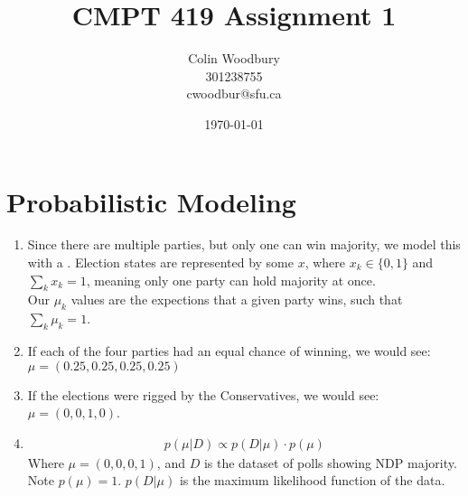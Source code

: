\documentclass{article}
\begin{document}
\title{CMPT 419 Assignment 1}
\author{Colin Woodbury\\ 301238755\\ cwoodbur@sfu.ca}
\date{\today}
\maketitle

\tableofcontents
\clearpage

\section{Probabilistic Modeling}

\begin{enumerate}
\item Since there are multiple parties, but only one can win majority,
  we model this with a . Election states
  are represented by some $x$, where $x_k \in \{0,1\}$ and $\sum_k x_k = 1$,
  meaning only one party can hold majority at once.\\
  Our $\mu_k$ values are the expections that a given party wins, such that
  $\sum_k \mu_k = 1$.
\item If each of the four parties had an equal chance of winning,
  we would see: $\mu = (0.25, 0.25, 0.25, 0.25)$
\item If the elections were rigged by the Conservatives, we would see:
  $\mu = (0,0,1,0)$.
\item \begin{align*}
  p(\mu | D) \propto p(D | \mu) \cdot p(\mu)
\end{align*}
  Where $\mu = (0,0,0,1)$, and $D$ is the dataset of polls showing NDP
  majority. Note $p(\mu) = 1$. $p(D | \mu)$ is the maximum likelihood
  function of the data.
\end{enumerate}
\end{document}

